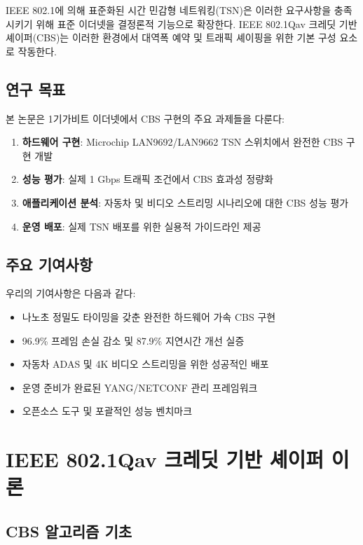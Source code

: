 \documentclass[12pt, a4paper]{article}
\begin{document}
IEEE 802.1에 의해 표준화된 시간 민감형 네트워킹(TSN)은 이러한 요구사항을 충족시키기 위해 표준 이더넷을 결정론적 기능으로 확장한다. IEEE 802.1Qav 크레딧 기반 셰이퍼(CBS)는 이러한 환경에서 대역폭 예약 및 트래픽 셰이핑을 위한 기본 구성 요소로 작동한다.

\subsection{연구 목표}

본 논문은 1기가비트 이더넷에서 CBS 구현의 주요 과제들을 다룬다:

\begin{enumerate}
    \item \textbf{하드웨어 구현}: Microchip LAN9692/LAN9662 TSN 스위치에서 완전한 CBS 구현 개발
    \item \textbf{성능 평가}: 실제 1 Gbps 트래픽 조건에서 CBS 효과성 정량화
    \item \textbf{애플리케이션 분석}: 자동차 및 비디오 스트리밍 시나리오에 대한 CBS 성능 평가
    \item \textbf{운영 배포}: 실제 TSN 배포를 위한 실용적 가이드라인 제공
\end{enumerate}

\subsection{주요 기여사항}

우리의 기여사항은 다음과 같다:

\begin{itemize}
    \item 나노초 정밀도 타이밍을 갖춘 완전한 하드웨어 가속 CBS 구현
    \item 96.9\% 프레임 손실 감소 및 87.9\% 지연시간 개선 실증
    \item 자동차 ADAS 및 4K 비디오 스트리밍을 위한 성공적인 배포
    \item 운영 준비가 완료된 YANG/NETCONF 관리 프레임워크
    \item 오픈소스 도구 및 포괄적인 성능 벤치마크
\end{itemize}

\section{IEEE 802.1Qav 크레딧 기반 셰이퍼 이론}

\subsection{CBS 알고리즘 기초}
\end{document}
